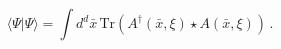\begin{equation}
\langle \Psi |\Psi \rangle =\int d^{d}\bar{x}\,\mathrm{Tr}\left( A^{\dagger
}(\bar{x},\xi )\star A(\bar{x},\xi )\right) \,.
\end{equation}

